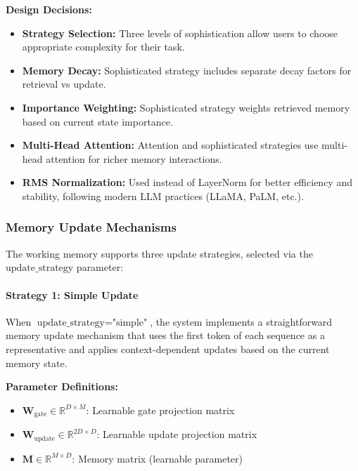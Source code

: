 \documentclass{article}
\begin{document}
\textbf{Design Decisions:} 
\begin{itemize}
\item \textbf{Strategy Selection:} Three levels of sophistication allow users to choose appropriate complexity for their task.
\item \textbf{Memory Decay:} Sophisticated strategy includes separate decay factors for retrieval vs update.
\item \textbf{Importance Weighting:} Sophisticated strategy weights retrieved memory based on current state importance.
\item \textbf{Multi-Head Attention:} Attention and sophisticated strategies use multi-head attention for richer memory interactions.
\item \textbf{RMS Normalization:} Used instead of LayerNorm for better efficiency and stability, following modern LLM practices (LLaMA, PaLM, etc.).
\end{itemize}

\subsubsection{Memory Update Mechanisms}

The working memory supports three update strategies, selected via the $\text{update\_strategy}$ parameter:

\paragraph{Strategy 1: Simple Update}

When $\text{update\_strategy} = \text{"simple"}$, the system implements a straightforward memory update mechanism that uses the first token of each sequence as a representative and applies context-dependent updates based on the current memory state.

\textbf{Parameter Definitions:}
\begin{itemize}
\item $\mathbf{W}_{\text{gate}} \in \mathbb{R}^{D \times M}$: Learnable gate projection matrix
\item $\mathbf{W}_{\text{update}} \in \mathbb{R}^{2D \times D}$: Learnable update projection matrix
\item $\mathbf{M} \in \mathbb{R}^{M \times D}$: Memory matrix (learnable parameter)
\end{itemize}
\end{document}
